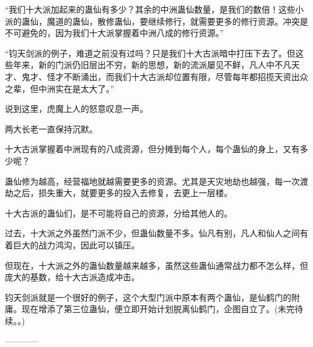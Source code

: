 \begin{this_body}
“我们十大派加起来的蛊仙有多少？其余的中洲蛊仙数量，是我们的数倍！这些小派的蛊仙，魔道的蛊仙，散修蛊仙，要继续修行，就需要更多的修行资源。冲突是不可避免的，因为我们十大派掌握着中洲八成的修行资源。”

“钧天剑派的例子，难道之前没有过吗？只是我们十大古派暗中打压下去了。但这些年来，新的门派仍旧层出不穷，新的思想，新的流派屡见不鲜，凡人中不凡天才、鬼才、怪才不断涌出，而我们十大古派却位置有限，尽管每年都招揽天资出众之辈，但中洲实在是太大了。”

说到这里，虎魔上人的怒意叹息一声。

两大长老一直保持沉默。

十大古派掌握着中洲现有的八成资源，但分摊到每个人，每个蛊仙的身上，又有多少呢？

蛊仙修为越高，经营福地就越需要更多的资源。尤其是天灾地劫也越强，每一次渡劫之后，损失重大，就要更多的投入去修复，去更上一层楼。

十大古派的蛊仙们，是不可能将自己的资源，分给其他人的。

过去，十大派之外虽然门派不少，但蛊仙数量不多。仙凡有别，凡人和仙人之间有着巨大的战力鸿沟，因此可以镇压。

但现在，十大派之外的蛊仙数量越来越多，虽然这些蛊仙通常战力都不怎么样，但庞大的基数，给十大古派造成冲击。

钧天剑派就是一个很好的例子，这个大型门派中原本有两个蛊仙，是仙鹤门的附庸。现在增添了第三位蛊仙，便立即开始计划脱离仙鹤门，企图自立了。(未完待续。。)

------------

\end{this_body}

